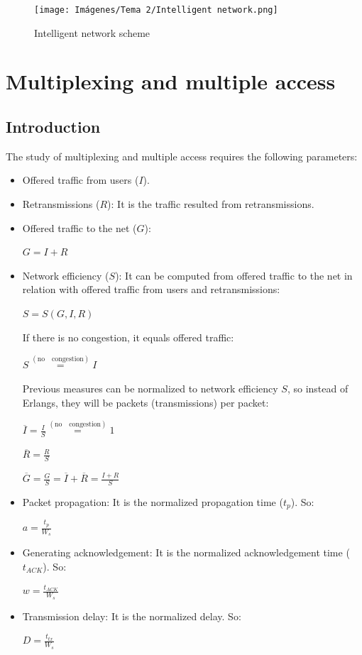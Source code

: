 \documentclass[
	12pt,
	twoside
]{book}
\begin{document}
\begin{figure}[H]
	\centering
	\texttt{[image: Imágenes/Tema 2/Intelligent network.png]}
	\caption{
		\label{fig:unit2_int_net}
		Intelligent network scheme
	}
\end{figure}

\section{Multiplexing and multiple access}

\subsection{Introduction}

The study of multiplexing and multiple access requires the following parameters:

\begin{itemize}
	\item Offered traffic from users ($I$).
	\item Retransmissions ($R$): It is the traffic resulted from retransmissions.
	\item {
		Offered traffic to the net ($G$):

		$G = I + R$
	}
	\item {
		Network efficiency ($S$): It can be computed from offered traffic to the net in relation with offered traffic from users and retransmissions:

		$S = S(G, I , R)$

		If there is no congestion, it equals offered traffic:

		$S \overset{\mathrm{(no \quad congestion)}}{=} I$

		Previous measures can be normalized to network efficiency $S$, so instead of Erlangs, they will be packets (transmissions) per packet:

		$\overline{I} = \frac {I} {S} \overset{\mathrm{(no \quad congestion)}}{=} 1$

		$\overline{R} = \frac {R} {S}$

		$\overline{G} = \frac {G} {S} = \overline{I} + \overline{R} = \frac {I + R} {S}$
	}
	\item {
		Packet propagation: It is the normalized propagation time ($t_p$). So:

		$a = \frac {t_p} {W_s}$
	}
	\item {
		Generating acknowledgement: It is the normalized acknowledgement time ($t_{ACK}$). So:

		$w = \frac {t_{ACK}} {W_s}$
	}
	\item {
		Transmission delay: It is the normalized delay. So:

		$D = \frac {t_{tx}} {W_s}$
	}
\end{itemize}
\end{document}
